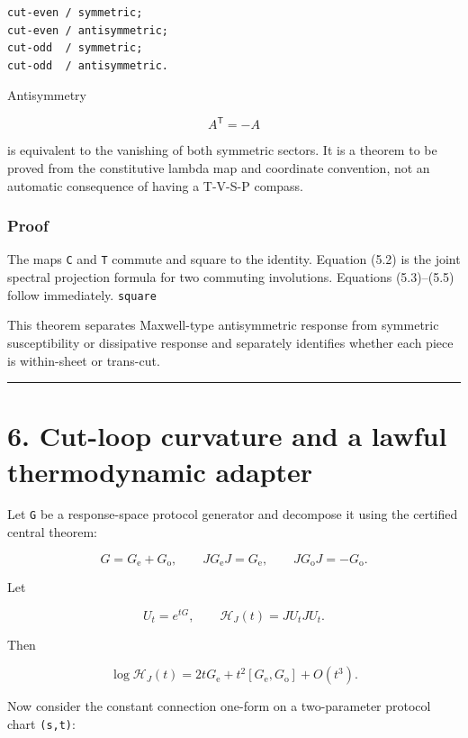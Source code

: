 \begin{verbatim}
cut-even / symmetric;
cut-even / antisymmetric;
cut-odd  / symmetric;
cut-odd  / antisymmetric.
\end{verbatim}

Antisymmetry

\[
A^{\mathsf T}=-A
\tag{5.6}
\]

is equivalent to the vanishing of both symmetric sectors. It is a theorem to
be proved from the constitutive lambda map and coordinate convention, not an
automatic consequence of having a T-V-S-P compass.

\hypertarget{proof-2}{%
\subsubsection{Proof}\label{proof-2}}

The maps \texttt{C} and \texttt{T} commute and square to the identity. Equation (5.2) is the
joint spectral projection formula for two commuting involutions. Equations
(5.3)--(5.5) follow immediately. \texttt{square}

This theorem separates Maxwell-type antisymmetric response from symmetric
susceptibility or dissipative response and separately identifies whether each
piece is within-sheet or trans-cut.

\begin{center}\rule{0.5\linewidth}{0.5pt}\end{center}

\hypertarget{cut-loop-curvature-and-a-lawful-thermodynamic-adapter}{%
\section{6. Cut-loop curvature and a lawful thermodynamic adapter}\label{cut-loop-curvature-and-a-lawful-thermodynamic-adapter}}

Let \texttt{G} be a response-space protocol generator and decompose it using the
certified central theorem:

\[
G=G_{\mathrm e}+G_{\mathrm o},
\qquad
JG_{\mathrm e}J=G_{\mathrm e},
\qquad
JG_{\mathrm o}J=-G_{\mathrm o}.
\tag{6.1}
\]

Let

\[
U_t=e^{tG},
\qquad
\mathscr H_J(t)=JU_tJU_t.
\tag{6.2}
\]

Then

\[
\log\mathscr H_J(t)
=
2tG_{\mathrm e}
+t^2[G_{\mathrm e},G_{\mathrm o}]
+O(t^3).
\tag{6.3}
\]

Now consider the constant connection one-form on a two-parameter protocol
chart \texttt{(s,t)}:

